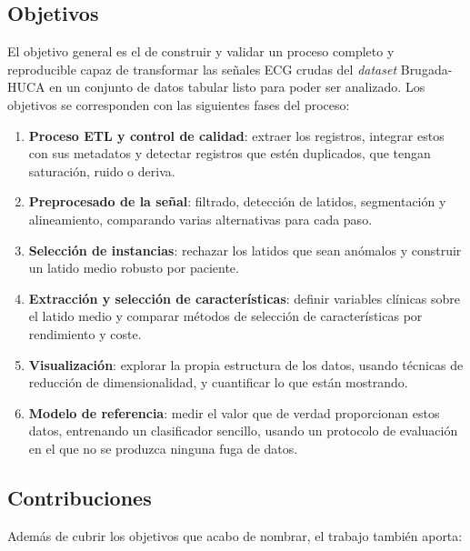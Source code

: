 \subsection{Objetivos}\label{sec:objetivos}

El objetivo general es el de construir y validar un proceso completo y reproducible capaz de transformar las señales ECG crudas del \emph{dataset} Brugada-HUCA en un conjunto de datos tabular listo para poder ser analizado. Los objetivos se corresponden con las siguientes fases del proceso:

\begin{enumerate}[label=\textbf{O\arabic*}, leftmargin=2.4em]
  \item \textbf{Proceso ETL y control de calidad}: extraer los registros, integrar estos con sus metadatos y detectar registros que estén duplicados, que tengan saturación, ruido o deriva.
  \item \textbf{Preprocesado de la señal}: filtrado, detección de latidos, segmentación y alineamiento, comparando varias alternativas para cada paso.
  \item \textbf{Selección de instancias}: rechazar los latidos que sean anómalos y construir un latido medio robusto por paciente.
  \item \textbf{Extracción y selección de características}: definir variables clínicas sobre el latido medio y comparar métodos de selección de características por rendimiento y coste.
  \item \textbf{Visualización}: explorar la propia estructura de los datos, usando técnicas de reducción de dimensionalidad, y cuantificar lo que están mostrando.
  \item \textbf{Modelo de referencia}: medir el valor que de verdad proporcionan estos datos, entrenando un clasificador sencillo, usando un protocolo de evaluación en el que no se produzca ninguna fuga de datos.
\end{enumerate}

\subsection{Contribuciones}

Además de cubrir los objetivos que acabo de nombrar, el trabajo también aporta:

